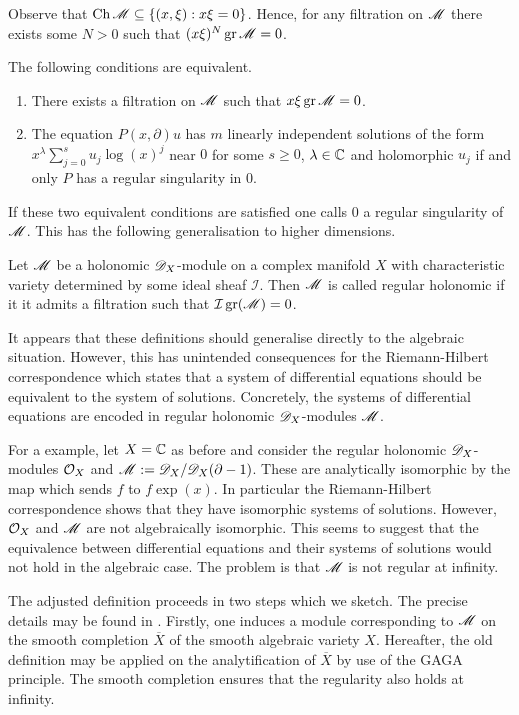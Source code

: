 Observe that $\operatorname{Ch} \mathscr{M}\subseteq \{(x,\xi): x\xi = 0\}$.
Hence, for any filtration on $\mathscr{M}$ there exists some $N>0$ such that
$(x\xi)^N \operatorname{gr}\mathscr{M} = 0 $.
\begin{proposition}
  The following conditions are equivalent.
  \begin{enumerate}
    \item There exists a filtration on $\mathscr{M}$ such that $x\xi\operatorname{gr}\mathscr{M} = 0$.
    \item The equation $P(x,\partial)u$ has $m$ linearly independent solutions of the form $x^\lambda \sum_{j=0}^s u_j \log(x)^j $
    near $0$ for some $s\geq 0$, $\lambda \in \mathbb{C}$ and holomorphic $u_j$ if and only $P$ has a regular singularity in $0$.
  \end{enumerate}
\end{proposition}
If these two equivalent conditions are satisfied one calls $0$ a regular singularity of $\mathscr{M}$.
This has the following generalisation to higher dimensions.
\begin{definition}
   Let $\mathscr{M}$ be a holonomic $\mathscr{D}_X$-module on a complex manifold $X$ with characteristic variety determined by some ideal sheaf $\mathcal{I}$. Then $\mathscr{M}$ is called regular holonomic if it it admits a filtration such that $\mathcal{I} \operatorname{gr}(\mathscr{M}) = 0$.
\end{definition}
It appears that these definitions should generalise directly to the algebraic situation.
However, this has unintended consequences for the Riemann-Hilbert correspondence which states that a system of differential equations should be equivalent to the system of solutions.
Concretely, the systems of differential equations are encoded in regular holonomic $\mathscr{D}_X$-modules $\mathscr{M}$.

For a example, let $X = \mathbb{C}$ as before and consider the regular holonomic $\mathscr{D}_X$-modules $\mathcal{O}_X$ and $\mathscr{M} := \mathscr{D}_X/\mathscr{D}_X(\partial - 1)$.
These are analytically isomorphic by the map which sends $f$ to $f\exp(x)$.
In particular the Riemann-Hilbert correspondence shows that they have isomorphic systems of solutions.
However, $\mathcal{O}_X$ and $\mathscr{M}$ are not algebraically isomorphic.
This seems to suggest that the equivalence between differential equations and their systems of solutions would not hold in the algebraic case.
The problem is that $\mathscr{M}$ is not regular at infinity.

 The adjusted definition proceeds in two steps which we sketch.
 The precise details may be found in \cite[Chapter 7]{borel1987algebraic}.
 Firstly, one induces a module corresponding to $\mathscr{M}$ on the smooth completion $\overline{X}$ of the smooth algebraic variety $X$.
 Hereafter, the old definition may be applied on the analytification of $\overline{X}$ by use of the GAGA principle.
 The smooth completion ensures that the regularity also holds at infinity.

